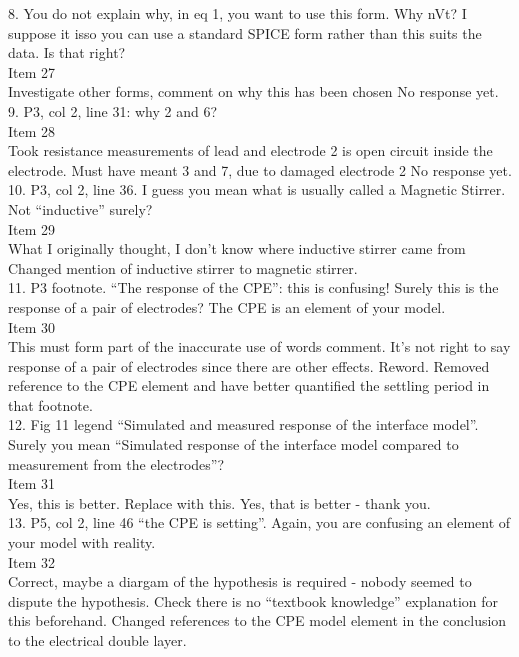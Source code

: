\documentclass[journal, a4paper]{IEEEtran}
\begin{document}
{{8. You do not explain why, in eq 1, you want to use this form. Why nVt? I suppose it isso you can use a standard SPICE form rather than this suits the data. Is that right?\\
{\color{OliveGreen} 
    Item 27\\
    {\color{Red} Investigate other forms, comment on why this has been chosen}
    No response yet.
}\\

9. P3, col 2, line 31: why 2 and 6?\\
{\color{OliveGreen}
    Item 28\\
    {\color{Red} Took resistance measurements of lead and electrode 2 is open circuit inside the electrode. Must have meant 3 and 7, due to damaged electrode 2}
    No response yet.
}\\

10. P3, col 2, line 36. I guess you mean what is usually called a Magnetic Stirrer. Not ``inductive'' surely?\\
{\color{OliveGreen} 
    Item 29\\
    {\color{Red} What I originally thought, I don't know where inductive stirrer came from}
    Changed mention of inductive stirrer to magnetic stirrer.
}\\

11. P3 footnote. ``The response of the CPE'': this is confusing! Surely this is the response of a pair of electrodes? The CPE is an element of your model.\\
{\color{OliveGreen} 
    Item 30\\
    {\color{Red} This must form part of the inaccurate use of words comment. It's not right to say response of a pair of electrodes since there are other effects. Reword.}
    Removed reference to the CPE element and have better quantified the settling period in that footnote.
}\\

12. Fig 11 legend ``Simulated and measured response of the interface model''. Surely you mean ``Simulated response of the interface model compared to measurement from the electrodes''?\\
{\color{OliveGreen}
    Item 31\\
    {\color{Red} Yes, this is better. Replace with this.}
    Yes, that is better - thank you.
}\\

13. P5, col 2, line 46 ``the CPE is setting''. Again, you are confusing an element of your model with reality.\\
{\color{OliveGreen}
    Item 32\\
    {\color{Red} Correct, maybe a diargam of the hypothesis is required - nobody seemed to dispute the hypothesis. Check there is no ``textbook knowledge'' explanation for this beforehand.}
    Changed references to the CPE model element in the conclusion to the electrical double layer.
}\\

}}
\end{document}
